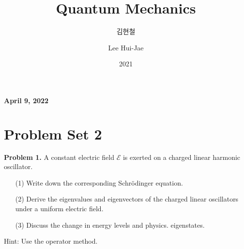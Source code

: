 \documentclass[floatfix,nofootinbib,superscriptaddress,fleqn]{revtex4-2}
\begin{document}
\title{\Large Quantum Mechanics}
\author{김현철}
\author{Lee Hui-Jae}
\date{2021}

\maketitle

 \textbf{\color{red} April 9, 2022} \\ 
\vspace{2cm}

\section*{\large Problem Set 2}
\noindent \textbf{Problem 1.}
A constant electric field $\mathcal{E}$ is exerted on a charged linear
harmonic oscillator. 
\begin{itemize}
\item[(1)] Write down the corresponding Schr\"odinger equation. 
\item[(2)] Derive the eigenvalues and eigenvectors of the charged
  linear oscillators under a uniform electric field. 
\item[(3)] Discuss the change in energy levels and physics. 
  eigenstates. 
\end{itemize}
Hint: Use the operator method.
\end{document}

